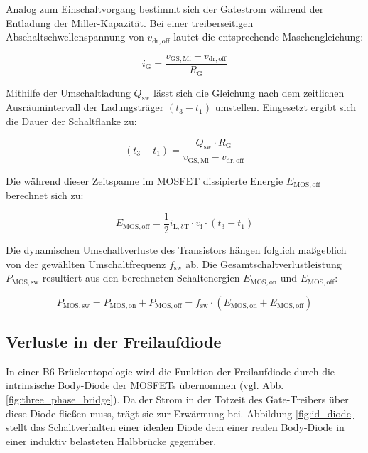 Analog zum Einschaltvorgang bestimmt sich der Gatestrom während der Entladung der Miller-Kapazität. Bei einer treiberseitigen Abschaltschwellenspannung von $v_\mathrm{dr,off}$ lautet die entsprechende Maschengleichung:

\begin{equation}
    i_\mathrm{G} = \frac{v_\mathrm{GS,Mi} - v_\mathrm{dr,off}}{R_\mathrm{G}}
    \label{eq:ig_ausschaltvorgang}
\end{equation}

Mithilfe der Umschaltladung $Q_\mathrm{sw}$ lässt sich die Gleichung nach dem zeitlichen Ausräumintervall der Ladungsträger $(t_3 - t_1)$ umstellen. Eingesetzt ergibt sich die Dauer der Schaltflanke zu:

\begin{equation}
    (t_3 - t_1) = \frac{Q_\mathrm{sw} \cdot R_\mathrm{G}}{v_\mathrm{GS,Mi} - v_\mathrm{dr,off}}
    \label{eq:t3t1_ausschaltvorgang}
\end{equation}

Die während dieser Zeitspanne im MOSFET dissipierte Energie $E_\mathrm{MOS,off}$ berechnet sich zu:

\begin{equation}
    E_\mathrm{MOS,off} = \frac{1}{2} i_\mathrm{L,\delta T} \cdot v_\mathrm{i} \cdot (t_3 - t_1)
    \label{eq:energie_ausschaltvorgang}
\end{equation}

Die dynamischen Umschaltverluste des Transistors hängen folglich maßgeblich von der gewählten Umschaltfrequenz $f_\mathrm{sw}$ ab. Die Gesamtschaltverlustleistung $P_\mathrm{MOS,sw}$ resultiert aus den berechneten Schaltenergien $E_\mathrm{MOS,on}$ und $E_\mathrm{MOS,off}$:

\begin{equation}
    P_\mathrm{MOS,sw} = P_\mathrm{MOS,on} + P_\mathrm{MOS,off} = f_\mathrm{sw} \cdot (E_\mathrm{MOS,on} + E_\mathrm{MOS,off})
    \label{eq:umschaltverluste_mos}
\end{equation}


\subsection{Verluste in der Freilaufdiode}

In einer B6-Brückentopologie wird die Funktion der Freilaufdiode durch die intrinsische Body-Diode der MOSFETs übernommen (vgl. Abb. \ref{fig:three_phase_bridge}). Da der Strom in der Totzeit des Gate-Treibers über diese Diode fließen muss, trägt sie zur Erwärmung bei. Abbildung \ref{fig:id_diode} stellt das Schaltverhalten einer idealen Diode dem einer realen Body-Diode in einer induktiv belasteten Halbbrücke gegenüber.

